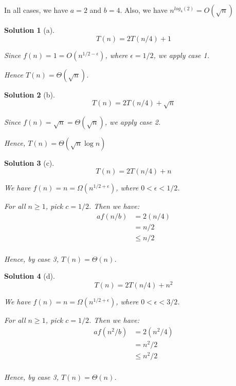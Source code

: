 \documentclass[letterpaper, 11pt]{article}
\theoremstyle{mystyle}
\newtheorem*{sln}{Solution}
\begin{document}
In all cases, we have $a=2$ and $b=4$. Also, we have $n^{log_4 (2)} = O(\sqrt{n})$

\begin{sln}[a]
    \[T(n) = 2T(n/4) + 1\]

    Since $f(n) = 1 = O(n^{1/2 - \epsilon})$, where $\epsilon = 1/2$, we apply case 1.

    Hence $T(n) = \Theta (\sqrt{n})$.
\end{sln}

\begin{sln}[b]
    \[T(n) = 2T(n/4) + \sqrt{n}\]

    Since $f(n) = \sqrt{n} = \Theta (\sqrt{n})$, we apply case 2.

    Hence, $T(n) = \Theta (\sqrt{n} \log n)$
\end{sln}

\begin{sln}[c]
    \[T(n) = 2T(n/4) + n\]

    We have $f(n) = n = \Omega (n^{1/2+\epsilon})$, where $0 <\epsilon < 1/2$. 

    For all $n \geq 1$, pick $c = 1/2$. Then we have:
    \begin{align*}
        af(n/b) & = 2(n/4) \\
                & = n/2 \\
                & \leq n/2 \\
    \end{align*}

    Hence, by case 3, $T(n) = \Theta(n)$.
\end{sln}

\begin{sln}[d]
    \[T(n) = 2T(n/4) + n^2 \]

    We have $f(n) = n = \Omega (n^{1/2+\epsilon})$, where $0 <\epsilon < 3/2$.

    For all $n \geq 1$, pick $c = 1/2$. Then we have:
    \begin{align*}
        af(n^2/b)   & = 2(n^2/4) \\
                    & = n^2/2 \\
                    & \leq n^2/2 \\
    \end{align*}

    Hence, by case 3, $T(n) = \Theta(n)$. 
\end{sln}
\end{document}
